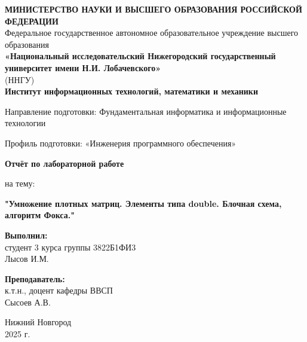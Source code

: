 \documentclass[12pt,a4paper]{extarticle}
\begin{document}
	
	\begin{titlepage}
		\begin{center}
			
			\onehalfspacing
			
			\begin{center}
				\textbf{МИНИСТЕРСТВО НАУКИ И ВЫСШЕГО ОБРАЗОВАНИЯ РОССИЙСКОЙ ФЕДЕРАЦИИ} \\ 			
				\vspace{0.5cm}
				Федеральное государственное автономное образовательное учреждение высшего образования \\ 
				\vspace{0.5cm}
				\textbf{«Национальный исследовательский Нижегородский государственный университет имени Н.И. Лобачевского»} \\
				(ННГУ)\\
				\vspace{0.5cm}
				\textbf{Институт информационных технологий, математики и механики}
			\end{center}
			\vspace{0.5cm}
			\begin{center}
			Направление подготовки: Фундаментальная информатика и информационные технологии
			
			
			Профиль подготовки: «Инженерия программного обеспечения»
			\end{center}
			\vspace{2.5cm}
			\begin{center}
				\textbf{Отчёт по лабораторной работе}

				на тему: 
				
				\textbf{"Умножение плотных матриц. Элементы типа double. Блочная схема, алгоритм Фокса."}
			\end{center}
			
			\vspace{2.5cm}
			
			\begin{flushright}
				\textbf{Выполнил:} \\
				студент 3 курса группы 3822Б1ФИ3 \\
				Лысов И.М. \\
				
				\vspace{1cm}
				
			\noindent\textbf{Преподаватель:} \\
			к.т.н., доцент кафедры ВВСП \\
			{Сысоев А.В.}
			\end{flushright}
			
			\vspace{2em}
			
			\vfill
			
			\begin{center}
				Нижний Новгород \\
				2025 г.
			\end{center}
			
		\end{center}
	\end{titlepage}
	
\end{document}
